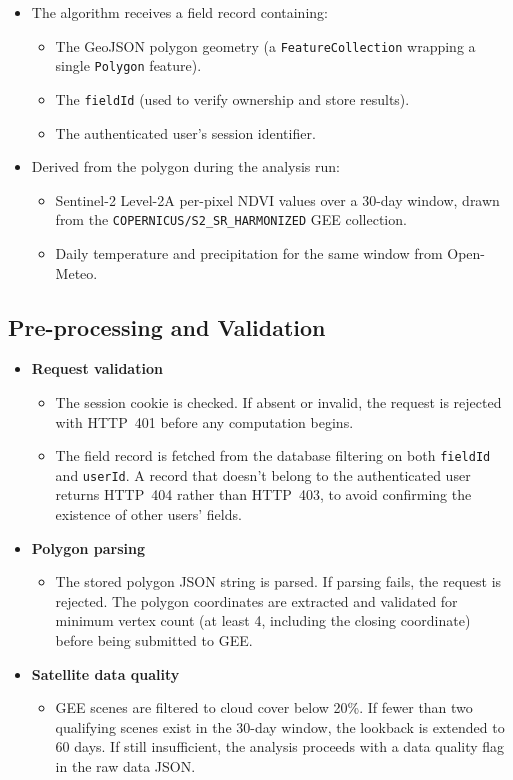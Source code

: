 \begin{itemize}
  \item The algorithm receives a field record containing:
    \begin{itemize}
      \item[-] The GeoJSON polygon geometry (a \texttt{FeatureCollection} wrapping a single \texttt{Polygon} feature).
      \item[-] The \texttt{fieldId} (used to verify ownership and store results).
      \item[-] The authenticated user's session identifier.
    \end{itemize}
  \item Derived from the polygon during the analysis run:
    \begin{itemize}
      \item[-] Sentinel-2 Level-2A per-pixel NDVI values over a 30-day window, drawn from the \texttt{COPERNICUS/S2\_SR\_HARMONIZED} GEE collection.
      \item[-] Daily temperature and precipitation for the same window from Open-Meteo.
    \end{itemize}
\end{itemize}

\subsection{Pre-processing and Validation}

\begin{itemize}
  \item \textbf{Request validation}
    \begin{itemize}
      \item[-] The session cookie is checked. If absent or invalid, the request is rejected with HTTP~401 before any computation begins.
      \item[-] The field record is fetched from the database filtering on both \texttt{fieldId} and \texttt{userId}. A record that doesn't belong to the authenticated user returns HTTP~404 rather than HTTP~403, to avoid confirming the existence of other users' fields.
    \end{itemize}
  \item \textbf{Polygon parsing}
    \begin{itemize}
      \item[-] The stored polygon JSON string is parsed. If parsing fails, the request is rejected. The polygon coordinates are extracted and validated for minimum vertex count (at least 4, including the closing coordinate) before being submitted to GEE.
    \end{itemize}
  \item \textbf{Satellite data quality}
    \begin{itemize}
      \item[-] GEE scenes are filtered to cloud cover below 20\%. If fewer than two qualifying scenes exist in the 30-day window, the lookback is extended to 60 days. If still insufficient, the analysis proceeds with a data quality flag in the raw data JSON.
    \end{itemize}
\end{itemize}

